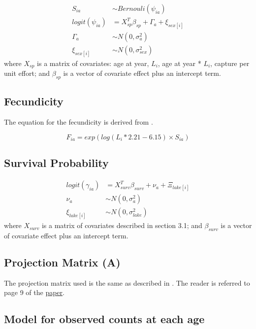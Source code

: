 \documentclass[
]{article}
\begin{document}
\[
\begin{split}
S_{ia} &\sim Bernouli(\psi_{ia}) \\
logit(\psi_{ia}) &= X_{sp}^T \beta_{sp} + \Gamma_a + \xi_{sex[i]}\\
\Gamma_a &\sim N(0, \sigma_a^2)\\
\xi_{sex[i]} &\sim N(0, \sigma_{sex}^2)
\end{split}
\] where \(X_{sp}\) is a matrix of covariates: age at year, \(L_i\), age
at year * \(L_i\), capture per unit effort; and \(\beta_{sp}\) is a
vector of covariate effect plus an intercept term.

\hypertarget{fecundicity}{%
\subsection{Fecundicity}\label{fecundicity}}

The equation for the fecundicity is derived from
\cite{baerum2021population}.

\[
F_{ia} = exp(log(L_i * 2.21 - 6.15) \times S_{ia})
\]

\hypertarget{survival-probability}{%
\subsection{Survival Probability}\label{survival-probability}}

\[
\begin{split}
logit(\gamma_{ia}) &= X_{surv}^T \beta_{surv} + \nu_a + \Xi_{lake[i]}\\
\nu_a &\sim N(0, \sigma_a^2)\\
\xi_{lake[i]} &\sim N(0, \sigma_{lake}^2)
\end{split}
\] where \(X_{surv}\) is a matrix of covariates described in section
3.1; and \(\beta_{surv}\) is a vector of covariate effect plus an
intercept term.

\hypertarget{projection-matrix-a}{%
\subsection{Projection Matrix (A)}\label{projection-matrix-a}}

The projection matrix used is the same as described in
\cite{baerum2021population}. The reader is referred to page 9 of the
\href{https://www.nature.com/articles/s41598-021-94350-x}{paper}.

\hypertarget{model-for-observed-counts-at-each-age}{%
\subsection{Model for observed counts at each
age}\label{model-for-observed-counts-at-each-age}}
\end{document}
